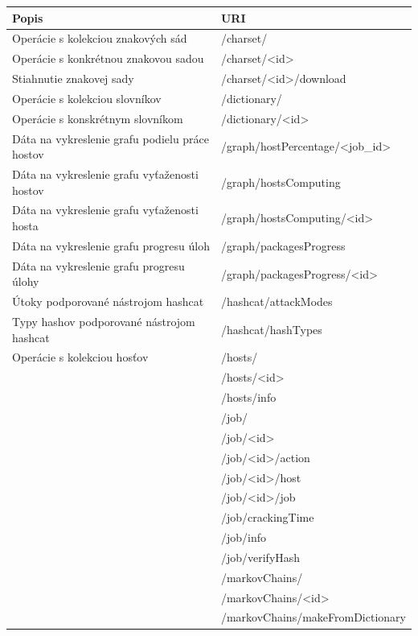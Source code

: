 \documentclass[slovak]{fitthesis}
\begin{document}
\begin{table}[h]
  \begin{center}
        \begin{tabular}{ |p{8cm}|p{7.4cm}|  }
         \hline
         Popis& URI\\
         \hline
          Operácie s kolekciou znakových sád & /charset/ \\
          Operácie s konkrétnou znakovou sadou & /charset/<id> \\
          Stiahnutie znakovej sady & /charset/<id>/download \\
          Operácie s kolekciou slovníkov & /dictionary/ \\
          Operácie s konskrétnym slovníkom & /dictionary/<id> \\
          Dáta na vykreslenie grafu podielu práce hostov & /graph/hostPercentage/<job\_id> \\
          Dáta na vykreslenie grafu vyťaženosti hostov & /graph/hostsComputing \\
          Dáta na vykreslenie grafu vyťaženosti hosta & /graph/hostsComputing/<id> \\
          Dáta na vykreslenie grafu progresu úloh & /graph/packagesProgress \\
          Dáta na vykreslenie grafu progresu úlohy & /graph/packagesProgress/<id> \\
          Útoky podporované nástrojom hashcat & /hashcat/attackModes \\
          Typy hashov podporované nástrojom hashcat & /hashcat/hashTypes \\
          Operácie s kolekciou hosťov & /hosts/ \\
           & /hosts/<id> \\
           & /hosts/info \\
           & /job/ \\
           & /job/<id> \\
           & /job/<id>/action \\
           & /job/<id>/host \\
           & /job/<id>/job \\
           & /job/crackingTime \\
           & /job/info \\
           & /job/verifyHash \\
           & /markovChains/ \\
           & /markovChains/<id> \\
           & /markovChains/makeFromDictionary \\

\end{tabular}
\end{center}
\end{table}
\end{document}
